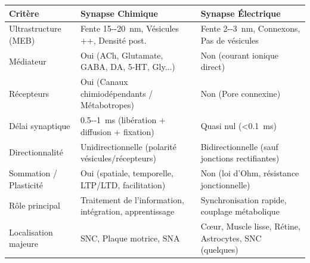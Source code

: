 \documentclass[11pt]{article}
\begin{document}
\begin{aretenir}
\begin{center}
\begin{tabularx}{\linewidth}{|l|X|X|}\hline
\rowcolor{popblueL}
\textbf{Critère} & \textbf{Synapse Chimique} & \textbf{Synapse Électrique} \\ \hline
Ultrastructure (MEB) & Fente \SI{15--20}{nm}, Vésicules ++, Densité post. & Fente \SI{2--3}{nm}, Connexons, Pas de vésicules \\ \hline
Médiateur & Oui (ACh, Glutamate, GABA, DA, 5-HT, Gly...) & Non (courant ionique direct) \\ \hline
Récepteurs & Oui (Canaux chimiodépendants / Métabotropes) & Non (Pore connexine) \\ \hline
Délai synaptique & \SI{0.5--1}{ms} (libération + diffusion + fixation) & Quasi nul (\textless \SI{0.1}{ms}) \\ \hline
Directionnalité & Unidirectionnelle (polarité vésicules/récepteurs) & Bidirectionnelle (sauf jonctions rectifiantes) \\ \hline
Sommation / Plasticité & Oui (spatiale, temporelle, LTP/LTD, facilitation) & Non (loi d'Ohm, résistance jonctionnelle) \\ \hline
Rôle principal & Traitement de l'information, intégration, apprentissage & Synchronisation rapide, couplage métabolique \\ \hline
Localisation majeure & SNC, Plaque motrice, SNA & Cœur, Muscle lisse, Rétine, Astrocytes, SNC (quelques) \\ \hline
\end{tabularx}
\end{center}
\end{aretenir}
\end{document}
